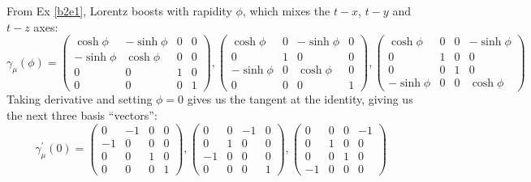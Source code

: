 \documentclass[10pt]{article}
\begin{document}
From Ex \ref{b2e1}, Lorentz boosts with rapidity $\phi$, which mixes the $t-x$, $t-y$ and $t-z$ axes:
$$
\gamma_\mu(\phi) = \begin{pmatrix}
	\cosh\phi&-\sinh\phi&0&0\\
	-\sinh\phi&\cosh\phi&0&0\\
	0&0&1&0\\
	0&0&0&1
\end{pmatrix},
\begin{pmatrix}
	\cosh\phi&0&-\sinh\phi&0\\
	0&1&0&0\\
	-\sinh\phi&0&\cosh\phi&0\\
	0&0&0&1
\end{pmatrix},
\begin{pmatrix}
	\cosh\phi&0&0&-\sinh\phi\\
	0&1&0&0\\
	0&0&1&0\\
	-\sinh\phi&0&0&\cosh\phi
\end{pmatrix}
$$
Taking derivative and setting $\phi = 0$ gives us the tangent at the identity, giving us the next three basis ``vectors'':
$$
\gamma^\prime_\mu(0) = \begin{pmatrix}
	0&-1&0&0\\
	-1&0&0&0\\
	0&0&1&0\\
	0&0&0&1
\end{pmatrix},
\begin{pmatrix}
	0&0&-1&0\\
	0&1&0&0\\
	-1&0&0&0\\
	0&0&0&1
\end{pmatrix},
\begin{pmatrix}
	0&0&0&-1\\
	0&1&0&0\\
	0&0&1&0\\
	-1&0&0&0
\end{pmatrix}
$$
\end{document}

